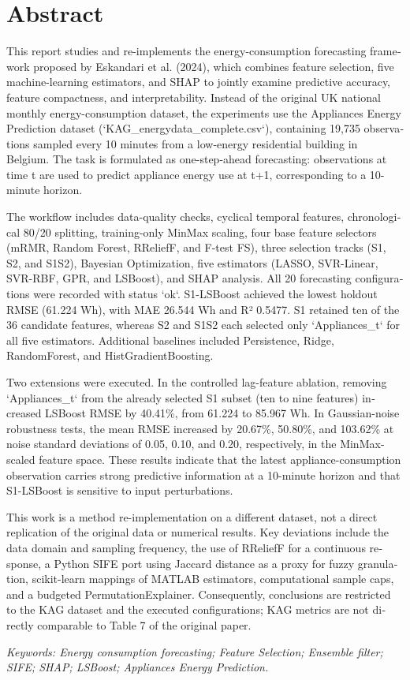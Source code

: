 \chapter*{Abstract}
\begin{otherlanguage}{english}

This report studies and re-implements the energy-consumption forecasting framework proposed by Eskandari et al. (2024), which combines feature selection, five machine-learning estimators, and SHAP to jointly examine predictive accuracy, feature compactness, and interpretability. Instead of the original UK national monthly energy-consumption dataset, the experiments use the Appliances Energy Prediction dataset (`KAG\_energydata\_complete.csv`), containing 19,735 observations sampled every 10 minutes from a low-energy residential building in Belgium. The task is formulated as one-step-ahead forecasting: observations at time t are used to predict appliance energy use at t+1, corresponding to a 10-minute horizon.

The workflow includes data-quality checks, cyclical temporal features, chronological 80/20 splitting, training-only MinMax scaling, four base feature selectors (mRMR, Random Forest, RReliefF, and F-test FS), three selection tracks (S1, S2, and S1S2), Bayesian Optimization, five estimators (LASSO, SVR-Linear, SVR-RBF, GPR, and LSBoost), and SHAP analysis. All 20 forecasting configurations were recorded with status `ok`. S1-LSBoost achieved the lowest holdout RMSE (61.224 Wh), with MAE 26.544 Wh and R² 0.5477. S1 retained ten of the 36 candidate features, whereas S2 and S1S2 each selected only `Appliances\_t` for all five estimators. Additional baselines included Persistence, Ridge, RandomForest, and HistGradient\allowbreak Boosting.

Two extensions were executed. In the controlled lag-feature ablation, removing `Appliances\_t` from the already selected S1 subset (ten to nine features) increased LSBoost RMSE by 40.41\%, from 61.224 to 85.967 Wh. In Gaussian-noise robustness tests, the mean RMSE increased by 20.67\%, 50.80\%, and 103.62\% at noise standard deviations of 0.05, 0.10, and 0.20, respectively, in the MinMax-scaled feature space. These results indicate that the latest appliance-consumption observation carries strong predictive information at a 10-minute horizon and that S1-LSBoost is sensitive to input perturbations.

This work is a method re-implementation on a different dataset, not a direct replication of the original data or numerical results. Key deviations include the data domain and sampling frequency, the use of RReliefF for a continuous response, a Python SIFE port using Jaccard distance as a proxy for fuzzy granulation, scikit-learn mappings of MATLAB estimators, computational sample caps, and a budgeted Permutation\allowbreak Explainer. Consequently, conclusions are restricted to the KAG dataset and the executed configurations; KAG metrics are not directly comparable to Table 7 of the original paper.

\emph{Keywords: Energy consumption forecasting; Feature Selection; Ensemble filter; SIFE; SHAP; LSBoost; Appliances Energy Prediction.}
\end{otherlanguage}
\clearpage
